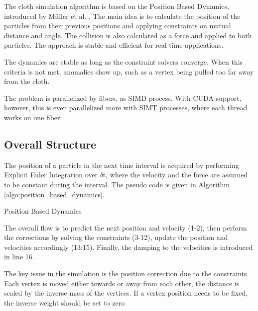 The cloth simulation algorithm is based on the Position Based Dynamics, introduced by M{\"u}ller et al. \cite{Muller2007}. The main idea is to calculate the position of the 
particles from their previous positions and applying constraints on mutual distance and angle. The collision is also calculated as a force and applied to both particles. 
The approach is stable and efficient for real time applications.

The dynamics are stable as long as the constraint solvers converge. When this criteria is not met, anomalies show up, such as a vertex being pulled too far away from the cloth. 

The problem is parallelized by fibers, as SIMD process. With CUDA support, however, this is even parallelized more with SIMT processes, where each thread works on one fiber

\subsection{Overall Structure}
The position of a particle in the next time interval is acquired by performing
Explicit Euler Integration over $\delta$t, where the velocity and the force are
assumed to be constant during the interval. The pseudo code is given  in
Algorithm \ref{algo:position_based_dynamics}.

\begin{algorithm}
\dontprintsemicolon %
\caption{Position Based Dynamics}
\label{algo:position_based_dynamics}
\end{algorithm}

The overall flow is to predict the next position and velocity (1-2), then
perform the corrections by solving the constraints (3-12), update the position
and velocities accordingly (13:15). Finally, the damping to the velocities is
introduced in line 16.

The key issue in the simulation is the position correction due to the constraints. Each vertex is moved either towards or away from each other, the distance is scaled by the 
inverse mass of the vertices. If a vertex position needs to be fixed, the inverse weight should be set to zero


